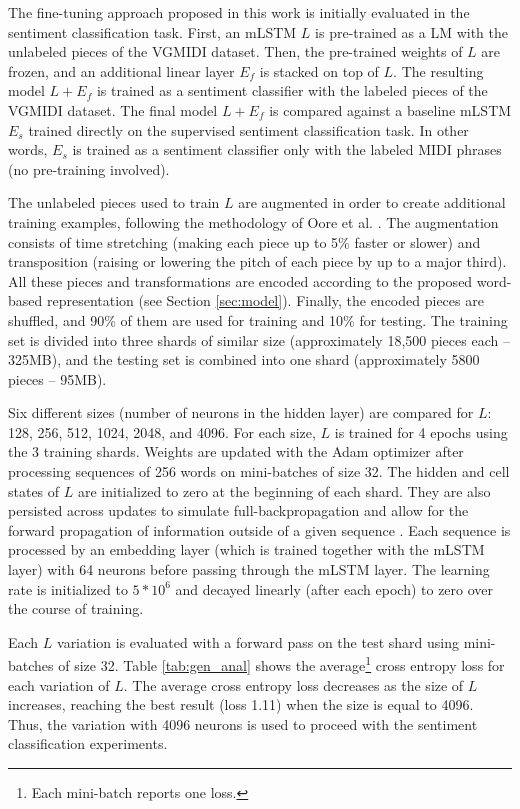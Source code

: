 The fine-tuning approach proposed in this work is initially evaluated in the sentiment classification task. First, an mLSTM $L$ is pre-trained as a LM with the unlabeled pieces of the VGMIDI dataset. Then, the pre-trained weights of $L$ are frozen, and an additional linear layer $E_f$ is stacked on top of $L$. The resulting model $L + E_f$ is trained as a sentiment classifier with the labeled pieces of the VGMIDI dataset. The final model $L + E_f$ is compared against a baseline mLSTM $E_s$ trained directly on the supervised sentiment classification task. In other words, $E_s$ is trained as a sentiment classifier only with the labeled MIDI phrases (no pre-training involved).

The unlabeled pieces used to train $L$ are augmented in order to create additional training examples, following the methodology of Oore et al. \cite{oore2017learning}. The augmentation consists of time stretching (making each piece up to 5\% faster or slower) and transposition (raising or lowering the pitch of each piece by up to a major third). All these pieces and transformations are encoded according to the proposed word-based representation (see Section \ref{sec:model}). Finally, the encoded pieces are shuffled, and 90\% of them are used for training and 10\% for testing. The training set is divided into three shards of similar size (approximately 18,500 pieces each -- 325MB), and the testing set is combined into one shard (approximately 5800 pieces -- 95MB).

Six different sizes (number of neurons in the hidden layer) are compared for $L$: 128, 256, 512, 1024, 2048, and 4096. For each size, $L$ is trained for 4 epochs using the 3 training shards. Weights are updated with the Adam optimizer after processing sequences of 256 words on mini-batches of size 32. The hidden and cell states of $L$ are initialized to zero at the beginning of each shard. They are also persisted across updates to simulate full-backpropagation and allow for the forward propagation of information outside of a given sequence \cite{radford_2017}. Each sequence is processed by an embedding layer (which is trained together with the mLSTM layer) with 64 neurons before passing through the mLSTM layer. The learning rate is initialized to $5*10^6$ and decayed linearly (after each epoch) to zero over the course of training.

Each $L$ variation is evaluated with a forward pass on the test shard using mini-batches of size 32. Table \ref{tab:gen_anal} shows the average\footnote{Each mini-batch reports one loss.} cross entropy loss for each variation of $L$. The average cross entropy loss decreases as the size of $L$ increases, reaching the best result (loss 1.11) when the size is equal to 4096. Thus, the variation with 4096 neurons is used to proceed with the sentiment classification experiments.

